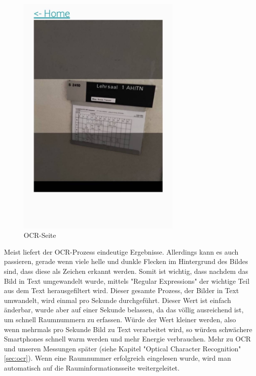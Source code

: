 \begin{figure}[H]
    \centering
    \includegraphics[width=80mm]{media/WebComponents/OCRSeite_light.jpg}
    \caption{OCR-Seite}
\end{figure}


Meist liefert der OCR-Prozess eindeutige Ergebnisse. Allerdings kann es auch passieren, gerade wenn viele helle und dunkle Flecken im Hintergrund des Bildes sind, dass diese als Zeichen erkannt werden. Somit ist wichtig, dass nachdem das Bild in Text umgewandelt wurde, mittels "Regular Expressions" der wichtige Teil aus dem Text herausgefiltert wird. Dieser gesamte Prozess, der Bilder in Text umwandelt, wird einmal pro Sekunde durchgeführt. Dieser Wert ist einfach änderbar, wurde aber auf einer Sekunde belassen, da das völlig ausreichend ist, um schnell Raumnummern zu erfassen. Würde der Wert kleiner werden, also wenn mehrmals pro Sekunde Bild zu Text verarbeitet wird, so würden schwächere Smartphones schnell warm werden und mehr Energie verbrauchen. Mehr zu OCR und unseren Messungen später (siehe Kapitel "Optical Character Recognition" \ref{sec:ocr}). Wenn eine Raumnummer erfolgreich eingelesen wurde, wird man automatisch auf die Rauminformationsseite weitergeleitet.


